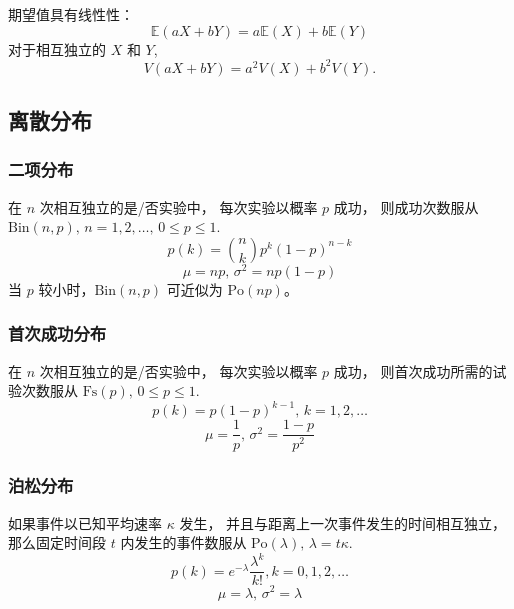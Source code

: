 期望值具有线性性：
\[\mathbb{E}(aX+bY) = a\mathbb{E}(X)+b\mathbb{E}(Y)\]
对于相互独立的 $X$ 和 $Y$, \[V(aX+bY) = a^2V(X)+b^2V(Y).\]

\subsection{离散分布}

\subsubsection{二项分布}
在 $n$ 次相互独立的是/否实验中，
每次实验以概率 $p$ 成功，
则成功次数服从 $\textrm{Bin}(n,p),\,n=1,2,\dots,\, 0\leq p\leq1$.
\[p(k)=\binom{n}{k}p^k(1-p)^{n-k}\]
\[\mu = np,\,\sigma^2=np(1-p)\]
当 $p$ 较小时，$\textrm{Bin}(n,p)$ 可近似为 $\textrm{Po}(np)$。

\subsubsection{首次成功分布}
在 $n$ 次相互独立的是/否实验中，
每次实验以概率 $p$ 成功，
则首次成功所需的试验次数服从 $\textrm{Fs}(p),\,0\leq p\leq1$.
\[p(k)=p(1-p)^{k-1},\,k=1,2,\dots\]
\[\mu = \frac1p,\,\sigma^2=\frac{1-p}{p^2}\]

\subsubsection{泊松分布}
如果事件以已知平均速率 $\kappa$ 发生，
并且与距离上一次事件发生的时间相互独立，
那么固定时间段 $t$ 内发生的事件数服从 $\textrm{Po}(\lambda),\,\lambda=t\kappa$.
\[p(k)=e^{-\lambda}\frac{\lambda^k}{k!}, k=0,1,2,\dots\]
\[\mu=\lambda,\,\sigma^2=\lambda\]



